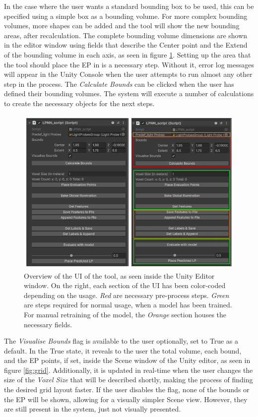 In the case where the user wants a standard bounding box to be used, this can be specified using a simple box as a bounding volume. For more complex bounding volumes, more shapes can be added and the tool will show the new bounding areas, after recalculation. The complete bounding volume dimensions are shown in the editor window using fields that describe the Center point and the Extend of the bounding volume in each axis, as seen in figure \ref{fig:UI_editor}. Setting up the area that the tool should place the EP in is a necessary step. Without it, error log messages will appear in the Unity Console when the user attempts to run almost any other step in the process. The \textit{Calculate Bounds} can be clicked when the user has defined their bounding volumes. The system will execute a number of calculations to create the necessary objects for the next steps.\newline

\begin{figure}[h]
	\centering
	\includegraphics[scale=0.53]{Graphics/UI_parent_combined.png}
	\caption{Overview of the UI of the tool, as seen inside the Unity Editor window. On the right, each section of the UI has been color-coded depending on the usage. \textit{Red} are necessary pre-process steps. \textit{Green} are steps required for normal usage, when a model has been trained. For manual retraining of the model, the \textit{Orange} section houses the necessary fields.}
	\label{fig:UI_editor}
\end{figure}


The \textit{Visualise Bounds} flag is available to the user optionally, set to True as a default. In the True state, it reveals to the user the total volume, each bound, and the EP points, if set, inside the Scene window of the Unity editor, as seen in figure \ref{fig:grid}. Additionally, it is updated in real-time when the user changes the size of the \textit{Voxel Size} that will be described shortly, making the process of finding the desired grid layout faster. If the user disables the flag, none of the bounds or the EP will be shown, allowing for a visually simpler Scene view. However, they are still present in the system, just not visually presented.

